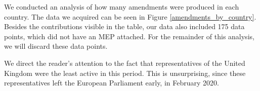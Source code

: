 \documentclass[lettersize,journal]{IEEEtran}
\begin{document}

We conducted an analysis of how many amendments were produced in each country. The data we acquired can be seen in Figure \ref{amendments_by_country}. Besides the contributions visible in the table, our data also included 175 data points, which did not have an MEP attached. For the remainder of this analysis, we will discard these data points.

We direct the reader's attention to the fact that representatives of the United Kingdom were the least active in this period. This is unsurprising, since these representatives left the European Parliament early, in February 2020.
\end{document}
